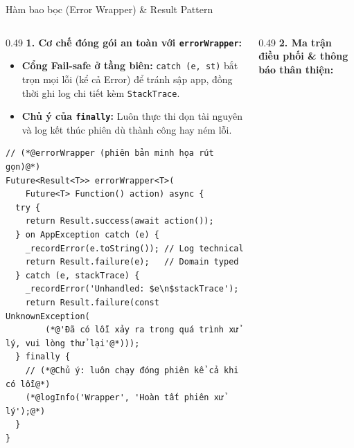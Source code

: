 \documentclass[aspectratio=169, 10pt]{beamer}
\begin{document}
\begin{frame}[fragile]{Hàm bao bọc (Error Wrapper) \& Result Pattern}
  \vspace{-0.35cm}
  \begin{columns}[t,onlytextwidth]
    \begin{column}{0.49\textwidth}
      \footnotesize
      \textbf{1. Cơ chế đóng gói an toàn với \texttt{errorWrapper}:}
      \begin{itemize}
        \item \textbf{Cổng Fail-safe ở tầng biên:} \texttt{catch (e, st)} bắt trọn mọi lỗi (kể cả Error) để tránh sập app, đồng thời ghi log chi tiết kèm \texttt{StackTrace}.
        \item \textbf{Chủ ý của \texttt{finally}:} Luôn thực thi dọn tài nguyên và log kết thúc phiên dù thành công hay ném lỗi.
      \end{itemize}

      \begin{lstlisting}[basicstyle=\ttfamily\tiny\color{black}, columns=flexible]
// (*@errorWrapper (phiên bản minh họa rút gọn)@*)
Future<Result<T>> errorWrapper<T>(
    Future<T> Function() action) async {
  try {
    return Result.success(await action());
  } on AppException catch (e) {
    _recordError(e.toString()); // Log technical
    return Result.failure(e);   // Domain typed
  } catch (e, stackTrace) {
    _recordError('Unhandled: $e\n$stackTrace');
    return Result.failure(const UnknownException(
        (*@'Đã có lỗi xảy ra trong quá trình xử lý, vui lòng thử lại'@*)));
  } finally {
    // (*@Chủ ý: luôn chạy đóng phiên kể cả khi có lỗi@*)
    (*@logInfo('Wrapper', 'Hoàn tất phiên xử lý');@*)
  }
}
      \end{lstlisting}
    \end{column}

    \begin{column}{0.49\textwidth}
      \footnotesize
      \textbf{2. Ma trận điều phối \& thông báo thân thiện:}
      \vspace{0.08cm}


\end{column}
\end{columns}
\end{frame}
\end{document}
